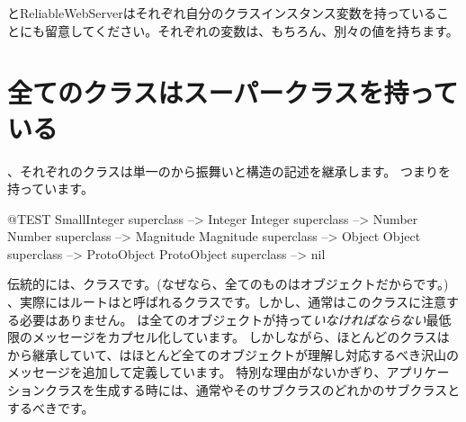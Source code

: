 \documentclass[a4paper,10pt,twoside]{book}
\begin{document}
と{ReliableWebServer}はそれぞれ自分のクラスインスタンス変数を持っていることにも留意してください。それぞれの変数は、もちろん、別々の値を持ちます。

\section{全てのクラスはスーパークラスを持っている}


、それぞれのクラスは単一のから振舞いと構造の記述を継承します。
つまりを持っています。

\begin{code}{@TEST}
SmallInteger superclass --> Integer
Integer superclass          --> Number
Number superclass        --> Magnitude
Magnitude superclass    --> Object
Object superclass           --> ProtoObject
ProtoObject superclass  --> nil
\end{code}

伝統的には、クラスです。(なぜなら、全てのものはオブジェクトだからです。)
、実際にはルートはと呼ばれるクラスです。しかし、通常はこのクラスに注意する必要はありません。
は全てのオブジェクトが持って\emph{いなければならない}最低限のメッセージをカプセル化しています。
しかしながら、ほとんどのクラスはから継承していて、はほとんど全てのオブジェクトが理解し対応するべき沢山のメッセージを追加して定義しています。
特別な理由がないかぎり、アプリケーションクラスを生成する時には、通常やそのサブクラスのどれかのサブクラスとするべきです。
\end{document}
